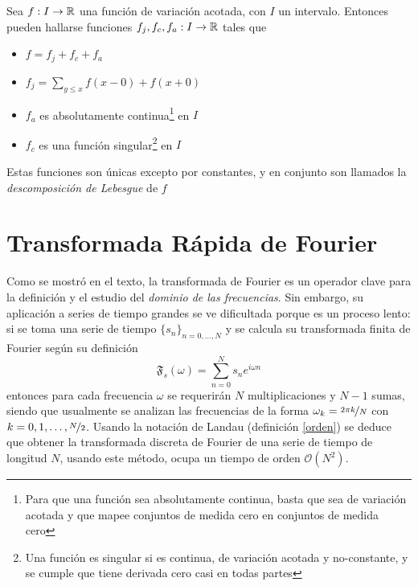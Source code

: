 \begin{thrm}
Sea $f:I\rightarrow \mathbb{R}$ una funci\'on de variaci\'on acotada, con $I$ un intervalo. Entonces pueden 
hallarse funciones $f_j, f_c, f_a :I\rightarrow \mathbb{R}$ tales que
\begin{itemize}
\item $f = f_j+ f_c+ f_a$
\item $f_j = \sum_{y \leq x} f(x-0) + f(x+0)$
\item $f_a$ es absolutamente continua\footnote{Para que una funci\'on sea absolutamente continua,
basta que sea de variaci\'on acotada y que mapee conjuntos de medida cero en conjuntos de medida
cero} en $I$
\item $f_c$ es una funci\'on singular\footnote{Una funci\'on es singular si es continua, de 
variaci\'on acotada y no-constante, y se cumple que tiene derivada cero casi en todas partes} en 
$I$
\end{itemize}
Estas funciones son \'unicas excepto por constantes, y en conjunto son llamados la 
\textit{descomposici\'on de Lebesgue} de $f$
\label{Lebesgue_decomp}
\end{thrm}


\section{Transformada R\'apida de Fourier}

Como se mostró en el texto, la transformada de Fourier es un operador clave para la definición y el
estudio del \textit{dominio de las frecuencias}. Sin embargo, su aplicación a series de tiempo grandes se ve
dificultada porque es un proceso lento: si se toma una serie de tiempo 
$\{s_n\}_{n=0,\dots,N}$ y se calcula su transformada finita de Fourier según su definición
\begin{equation*}
\mathfrak{F}_s(\omega) = \sum_{n=0}^{N} s_n e^{i \omega n}
\end{equation*}
entonces para cada frecuencia $\omega$ se requerirán $N$ multiplicaciones y $N-1$ sumas, siendo que
usualmente se analizan las frecuencias de la forma $\omega_k = \nicefrac{2 \pi k}{N}$ 
con $k = 0, 1, \dots, \nicefrac{N}{2}$.
Usando la notación de Landau (definición \ref{orden}) se deduce que obtener la transformada discreta
de Fourier de una serie de tiempo de longitud $N$, usando este método, 
ocupa un tiempo de orden $\mathcal{O}(N^{2})$.

